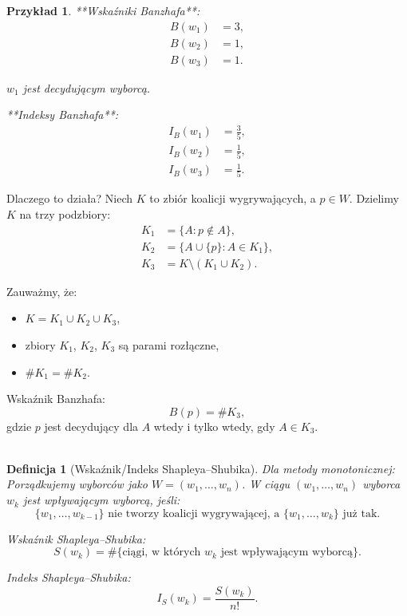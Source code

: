 \documentclass[12pt,a4paper]{article}
\theoremstyle{break}
\newtheorem{definition}{Definicja}[section]
\newtheorem{example}{Przykład}[section]
\begin{document}
\begin{example}
		**Wskaźniki Banzhafa**:
		\begin{align*}
			B(w_1) &= 3, \\
			B(w_2) &= 1, \\
			B(w_3) &= 1.
		\end{align*}
		
		$w_1$ jest decydującym wyborcą.
		
		**Indeksy Banzhafa**:
		\begin{align*}
			I_B(w_1) &= \frac{3}{5}, \\
			I_B(w_2) &= \frac{1}{5}, \\
			I_B(w_3) &= \frac{1}{5}.
		\end{align*}
	\end{example}
	
	
	
	Dlaczego to działa?  
	Niech $K$ to zbiór koalicji wygrywających, a $p \in W$. Dzielimy $K$ na trzy podzbiory:
	\begin{align*}
		K_1 &= \{A : p \notin A\}, \\
		K_2 &= \{A \cup \{p\} : A \in K_1\}, \\
		K_3 &= K \setminus (K_1 \cup K_2).
	\end{align*}
	
	Zauważmy, że:
	\begin{itemize}
		\item $K = K_1 \cup K_2 \cup K_3$,
		\item zbiory $K_1$, $K_2$, $K_3$ są parami rozłączne,
		\item $\# K_1 = \# K_2$.
	\end{itemize}
	
	Wskaźnik Banzhafa:
	\[
	B(p) = \# K_3,
	\]
	gdzie $p$ jest decydujący dla $A$ wtedy i tylko wtedy, gdy $A \in K_3$.\\\\
	
	\begin{definition}[Wskaźnik/Indeks Shapleya–Shubika]
		Dla metody monotonicznej:  
		Porządkujemy wyborców jako $W = (w_1, \dots, w_n)$.  
		W ciągu $(w_1, \dots, w_n)$ wyborca $w_k$ jest wpływającym wyborcą, jeśli:
		\[
		\{w_1, \dots, w_{k-1}\} \text{ nie tworzy koalicji wygrywającej, a } \{w_1, \dots, w_k\} \text{ już tak.}
		\]
		
		Wskaźnik Shapleya–Shubika:
		\[
		S(w_k) = \# \{\text{ciągi, w których } w_k \text{ jest wpływającym wyborcą}\}.
		\]
		
		Indeks Shapleya–Shubika:
		\[
		I_S(w_k) = \frac{S(w_k)}{n!}.
		\]
	\end{definition}
	
\end{document}

